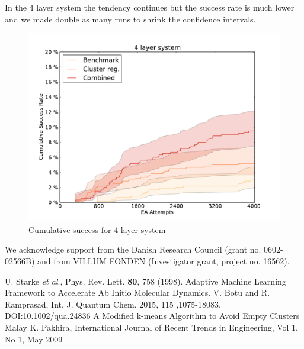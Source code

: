 \documentclass[%
 aps,
 prl,%
 amsmath,amssymb,
 reprint,%
]{revtex4-1}
\begin{document}
In the 4 layer system the tendency continues but the success rate is much lower and we made double as many runs to shrink the confidence intervals. 

\begin{figure}[h]
    \centering
    \includegraphics[width=1.0\columnwidth]{4lsuccess.pdf}
    \caption{Cumulative success for 4 layer system}
    \label{4lfig}
\end{figure}


We acknowledge support from the Danish Research Council (grant no. 0602-02566B) and from VILLUM FONDEN (Investigator grant, project no. 16562).

\begin{thebibliography}{12}  
   U. Starke \textit{et al}., Phys. Rev. Lett. \textbf{80}, 758 (1998).    
   {Adaptive Machine Learning Framework to Accelerate Ab Initio Molecular Dynamics.} V. Botu and R. Ramprasad, Int. J. Quantum Chem. 2015, 115 ,1075-18083. DOI:10.1002/qua.24836    
  {A Modified k-means Algorithm to Avoid Empty Clusters} Malay K. Pakhira, International Journal of Recent Trends in Engineering, Vol 1, No 1, May 2009
 \end{thebibliography}
\end{document}
